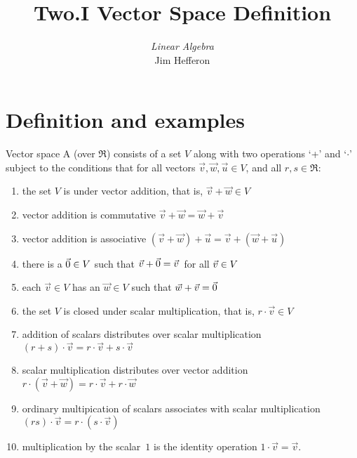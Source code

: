 \documentclass[10pt,t]{beamer}
\title[Vector Space Definition] %
{Two.I Vector Space Definition}
\author{\textit{Linear Algebra} \\ {\small Jim Hef{}feron}}
\institute{
  \texttt{http://joshua.smcvt.edu/linearalgebra}
}
\date{}
\begin{document}
\begin{frame}
  \titlepage
\end{frame}




\section{Definition and examples}





\begin{frame}{Vector space}
A 
(over \( \Re \)) consists of a set \( V \) along with
two operations `+' and `\( \cdot \)' subject to the conditions
that for all vectors \( \vec{v},\vec{w},\vec{u}\in V \), 
and all 
\( r,s\in\Re \):
\begin{enumerate}
\item the set $V$ is  under
  vector addition, that is, 
  \( \vec{v}+\vec{w}\in V \)
\item vector addition is commutative
  \( \vec{v}+\vec{w}=\vec{w}+\vec{v} \) 
\item vector addition is associative
  \( (\vec{v}+\vec{w})+\vec{u}=\vec{v}+(\vec{w}+\vec{u}) \)
\item there is a 
    \( \vec{0}\in V \) such that
    \( \vec{v}+\vec{0}=\vec{v}\, \) for all \( \vec{v}\in V\/ \)
\item each \( \vec{v}\in V \) has an
    \( \vec{w}\in V \) such that \( \vec{w}+\vec{v}=\vec{0} \)
\pause\item  the set $V$ is closed under
    scalar multiplication, that is, 
   \( r\cdot\vec{v}\in V \)
\item addition of scalars distributes over scalar multiplication
 \( (r+s)\cdot\vec{v}=r\cdot\vec{v}+s\cdot\vec{v} \)
\item scalar multiplication distributes over vector addition
  \( r\cdot(\vec{v}+\vec{w})=r\cdot\vec{v}+r\cdot\vec{w} \)
\item ordinary multipication of scalars associates with 
  scalar multiplication \( (rs)\cdot\vec{v} =r\cdot(s\cdot\vec{v}) \)
\item multiplication by the scalar~$1$ is the 
  identity operation \( 1\cdot\vec{v}=\vec{v} \).
\end{enumerate}
\end{frame}
\end{document}
